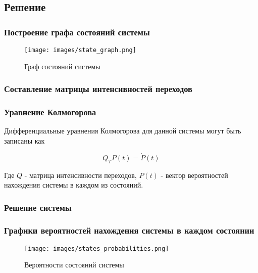 \subsection{Решение}\label{sec:First}

\subsubsection{Построение графа состояний системы}

\begin{figure}[H] %
    \centering %
    \texttt{[image: images/state\_graph.png]} %
    \caption{Граф состояний системы} %
    \label{img:state_graph.png} %
\end{figure}

\subsubsection{Составление матрицы интенсивностей переходов}

\subsubsection{Уравнение Колмогорова}

Дифференциальные уравнения Колмогорова для данной системы могут быть записаны как

$$
Q_T P(t) = \dot{P}(t)
$$

Где $Q$ - матрица интенсивности переходов, $P(t)$ - вектор вероятностей нахождения системы в каждом из состояний.

\subsubsection{Решение системы}

\subsubsection{Графики вероятностей нахождения системы в каждом состоянии}

\begin{figure}[H] %
    \centering %
    \texttt{[image: images/states\_probabilities.png]} %
    \caption{Вероятности состояний системы} %
    \label{img:states_probabilities.png} %
\end{figure}

